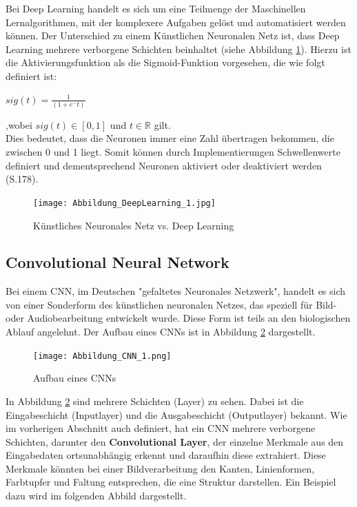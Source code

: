 \documentclass[12pt]{scrreprt}
\begin{document}
Bei Deep Learning handelt es sich um eine Teilmenge der Maschinellen Lernalgorithmen, mit der komplexere Aufgaben gelöst und automatisiert werden können. Der Unterschied zu einem Künstlichen Neuronalen Netz ist, dass Deep Learning mehrere verborgene Schichten beinhaltet (siehe Abbildung \ref{fig:fig4}). Hierzu ist die Aktivierungsfunktion als die Sigmoid-Funktion vorgesehen, die wie folgt definiert ist:

\begin{center}
	$sig(t) = \frac{1}{(1 + e^-t)}$\\
\end{center}

,wobei $sig(t) \in [0,1]$ und $ t \in \mathbb{R}$ gilt. 
\\

Dies bedeutet, dass die Neuronen immer eine Zahl übertragen bekommen, die zwischen 0 und 1 liegt. Somit können durch Implementierungen Schwellenwerte definiert und dementsprechend Neuronen aktiviert oder deaktiviert werden \cite{Frochte2021}(S.178). \\

\begin{figure}[h!]
	\centering
	\texttt{[image: Abbildung\_DeepLearning\_1.jpg]}
	\caption{Künstliches Neuronales Netz vs. Deep Learning \cite{Abbildung4}}
	\label{fig:fig4}
\end{figure}

\subsection{Convolutional Neural Network}

Bei einem CNN, im Deutschen "gefaltetes Neuronales Netzwerk", handelt es sich von einer Sonderform des künstlichen neuronalen Netzes, das speziell für Bild- oder Audiobearbeitung entwickelt wurde. Diese Form ist teils an den biologischen Ablauf angelehnt.\cite{Luber2019} Der Aufbau eines CNNs ist in Abbildung \ref{fig:fig5} dargestellt.

\begin{figure}[h!]
	\centering
	\texttt{[image: Abbildung\_CNN\_1.png]}
	\caption{Aufbau eines CNNs \cite{Abbildung5}}
	\label{fig:fig5}
\end{figure}

In Abbildung \ref{fig:fig5} sind mehrere Schichten (Layer) zu sehen. Dabei ist die Eingabeschicht (Inputlayer) und die Ausgabeschicht (Outputlayer) bekannt. Wie im vorherigen Abschnitt auch definiert, hat ein CNN mehrere verborgene Schichten, darunter den \textbf{Convolutional Layer}, der einzelne Merkmale aus den Eingabedaten ortsunabhängig erkennt und daraufhin diese extrahiert. Diese Merkmale könnten bei einer Bildverarbeitung den Kanten, Linienformen, Farbtupfer und Faltung entsprechen, die eine Struktur darstellen. Ein Beispiel dazu wird im folgenden Abbild dargestellt.
\end{document}
